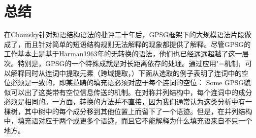 \section{总结}
\label{Abschnitt-Einordnung-GPSG}\label{sec-derivation-GPSG}

在Chomsky针对短语结构语法的批评二十年后，GPSG框架下的大规模语法片段做成了，而且针对简单的短语结构规则无法解释的现象都提供了解释。尽管GPSG的工作基本上是基于Harman1963年的无转换的语法，他们也已经远远超越了这一层次。特别是，GPSG的一个特殊成就是\citet{Gazdar81}对长距离依存的处理。通过应用\slasch"=机制，可以解释同时从连词中提取元素（跨域提取，\citealp{Ross67}）下面从\citet[]{Gazdar81}选取的例子表明了连词中的空位必须是一致的，即某范畴的填充语必须对应于每个连词的空位：
Some
\eal\settowidth{}
\label{ex-atb-gazdar}
\zl
GPSG貌似可以出了这类带有空位信息传送的机制。在对称并列结构中，每个连词中的\slasch 成分必须是相同的。一方面，转换的方法并不直接，因为我们通常认为这类分析中有一棵树，其中树中的每个成分移到其他位置上而留下了一个语迹。但是，在并列结构中，填充语对应于两个或更多个语迹，而且它不能解释为什么填充语来自不只一个地方。
